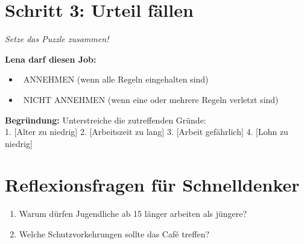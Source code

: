 \documentclass[12pt, a4paper]{article}
\newenvironment{taskbox}{%
	\begin{framed}
		\color{black}
	}{%
	\end{framed}
}
\newcommand{\checkbox}{\raisebox{-0.2ex}{\Large$\square$}}
\begin{document}
	\vspace{0.3cm}
	
	\section*{\color{taskgold}Schritt 3: Urteil fällen}
	
	\begin{taskbox}
		\textit{Setze das Puzzle zusammen!}
		
		\textbf{Lena darf diesen Job:}
		\begin{itemize}[leftmargin=*]
			\item \checkbox\ \textcolor{acceptgreen}{ANNEHMEN} (wenn alle Regeln eingehalten sind)
			\item \checkbox\ \textcolor{rejectred}{NICHT ANNEHMEN} (wenn eine oder mehrere Regeln verletzt sind)
		\end{itemize}
		
		\textbf{Begründung:} Unterstreiche die zutreffenden Gründe:\\
		1. [Alter zu niedrig] 2. [Arbeitszeit zu lang] 3. [Arbeit gefährlich] 4. [Lohn zu niedrig]
	\end{taskbox}
	
	\vspace{0.3cm}
	
	\section*{\color{taskgreen}Reflexionsfragen für Schnelldenker}
	
	\begin{taskbox}
		\begin{enumerate}
			\item Warum dürfen Jugendliche ab 15 länger arbeiten als jüngere?
			\item Welche Schutzvorkehrungen sollte das Café treffen?
		\end{enumerate}
	\end{taskbox}
	
\end{document}
